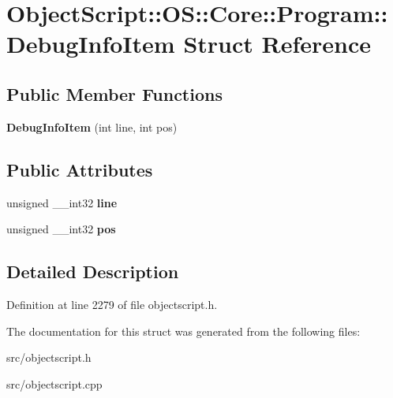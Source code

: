 \hypertarget{struct_object_script_1_1_o_s_1_1_core_1_1_program_1_1_debug_info_item}{}\section{Object\+Script\+:\+:OS\+:\+:Core\+:\+:Program\+:\+:Debug\+Info\+Item Struct Reference}
\label{struct_object_script_1_1_o_s_1_1_core_1_1_program_1_1_debug_info_item}
\subsection*{Public Member Functions}
\begin{DoxyCompactItemize}
\item 
{\bfseries Debug\+Info\+Item} (int line, int pos)\hypertarget{struct_object_script_1_1_o_s_1_1_core_1_1_program_1_1_debug_info_item_a1f9a872b1c741992729818bab0df3acb}{}\label{struct_object_script_1_1_o_s_1_1_core_1_1_program_1_1_debug_info_item_a1f9a872b1c741992729818bab0df3acb}

\end{DoxyCompactItemize}
\subsection*{Public Attributes}
\begin{DoxyCompactItemize}
\item 
unsigned \+\_\+\+\_\+int32 {\bfseries line}\hypertarget{struct_object_script_1_1_o_s_1_1_core_1_1_program_1_1_debug_info_item_af1de1ff1372a90791cc02eb54474675a}{}\label{struct_object_script_1_1_o_s_1_1_core_1_1_program_1_1_debug_info_item_af1de1ff1372a90791cc02eb54474675a}

\item 
unsigned \+\_\+\+\_\+int32 {\bfseries pos}\hypertarget{struct_object_script_1_1_o_s_1_1_core_1_1_program_1_1_debug_info_item_a3392f37974ce65140c7cddf6062106b3}{}\label{struct_object_script_1_1_o_s_1_1_core_1_1_program_1_1_debug_info_item_a3392f37974ce65140c7cddf6062106b3}

\end{DoxyCompactItemize}


\subsection{Detailed Description}


Definition at line 2279 of file objectscript.\+h.



The documentation for this struct was generated from the following files\+:\begin{DoxyCompactItemize}
\item 
src/objectscript.\+h\item 
src/objectscript.\+cpp\end{DoxyCompactItemize}
